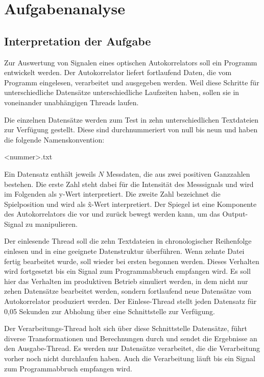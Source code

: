 \chapter{Aufgabenanalyse}\label{ch:aufgabenanalyse}


\section{Interpretation der Aufgabe}\label{sec:interpretation-der-aufgabe}
Zur Auswertung von Signalen eines optischen Autokorrelators soll ein Programm entwickelt werden.
Der Autokorrelator liefert fortlaufend Daten, die vom Programm eingelesen, verarbeitet und ausgegeben werden.
Weil diese Schritte für unterschiedliche Datensätze unterschiedliche Laufzeiten haben, sollen sie in voneinander unabhängigen Threads laufen.

Die einzelnen Datensätze werden zum Test in zehn unterschiedlichen Textdateien zur Verfügung gestellt.
Diese sind durchnummeriert von null bis neun und haben die folgende Namenskonvention:
\begin{center}
    <nummer>.txt
\end{center}
Ein Datensatz enthält jeweils $N$ Messdaten, die aus zwei positiven Ganzzahlen bestehen.
Die erste Zahl steht dabei für die Intensität des Messsignals und wird im Folgenden als y-Wert interpretiert.
Die zweite Zahl bezeichnet die Spielposition und wird als \~x-Wert interpretiert.
Der Spiegel ist eine Komponente des Autokorrelators die vor und zurück bewegt werden kann, um das Output-Signal zu manipulieren.

Der einlesende Thread soll die zehn Textdateien in chronologischer Reihenfolge einlesen und in eine geeignete Datenstruktur überführen.
Wenn zehnte Datei fertig bearbeitet wurde, soll wieder bei ersten begonnen werden.
Dieses Verhalten wird fortgesetzt bis ein Signal zum Programmabbruch empfangen wird.
Es soll hier das Verhalten im produktiven Betrieb simuliert werden, in dem nicht nur zehen Datensätze bearbeitet werden, sondern fortlaufend neue Datensätze vom Autokorrelator produziert werden.
Der Einlese-Thread stellt jeden Datensatz für 0,05 Sekunden zur Abholung über eine Schnittstelle zur Verfügung.

Der Verarbeitungs-Thread holt sich über diese Schnittstelle Datensätze, führt diverse Transformationen und Berechnungen durch und sendet die Ergebnisse an den Ausgabe-Thread.
Es werden nur Datensätze verarbeitet, die die Verarbeitung vorher noch nicht durchlaufen haben.
Auch die Verarbeitung läuft bis ein Signal zum Programmabbruch empfangen wird.

